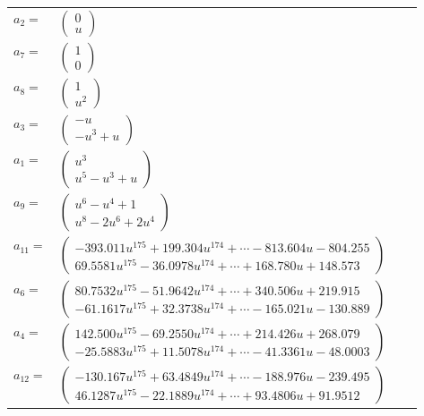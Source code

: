 \documentclass[1p]{elsarticle_modified}
\theoremstyle{definition}
\begin{document}
\begin{tabular}{m{7pt} m{180pt} m{7pt} m{180pt} }
\flushright $a_{2}=$&$\begin{pmatrix}0\\u\end{pmatrix}$ \\
\flushright $a_{7}=$&$\begin{pmatrix}1\\0\end{pmatrix}$ \\
\flushright $a_{8}=$&$\begin{pmatrix}1\\u^2\end{pmatrix}$ \\
\flushright $a_{3}=$&$\begin{pmatrix}- u\\- u^3+u\end{pmatrix}$ \\
\flushright $a_{1}=$&$\begin{pmatrix}u^3\\u^5- u^3+u\end{pmatrix}$ \\
\flushright $a_{9}=$&$\begin{pmatrix}u^6- u^4+1\\u^8-2 u^6+2 u^4\end{pmatrix}$ \\
\flushright $a_{11}=$&$\begin{pmatrix}-393.011 u^{175}+199.304 u^{174}+\cdots-813.604 u-804.255\\69.5581 u^{175}-36.0978 u^{174}+\cdots+168.780 u+148.573\end{pmatrix}$ \\
\flushright $a_{6}=$&$\begin{pmatrix}80.7532 u^{175}-51.9642 u^{174}+\cdots+340.506 u+219.915\\-61.1617 u^{175}+32.3738 u^{174}+\cdots-165.021 u-130.889\end{pmatrix}$ \\
\flushright $a_{4}=$&$\begin{pmatrix}142.500 u^{175}-69.2550 u^{174}+\cdots+214.426 u+268.079\\-25.5883 u^{175}+11.5078 u^{174}+\cdots-41.3361 u-48.0003\end{pmatrix}$ \\
\flushright $a_{12}=$&$\begin{pmatrix}-130.167 u^{175}+63.4849 u^{174}+\cdots-188.976 u-239.495\\46.1287 u^{175}-22.1889 u^{174}+\cdots+93.4806 u+91.9512\end{pmatrix}$ \\

\end{tabular}
\end{document}
